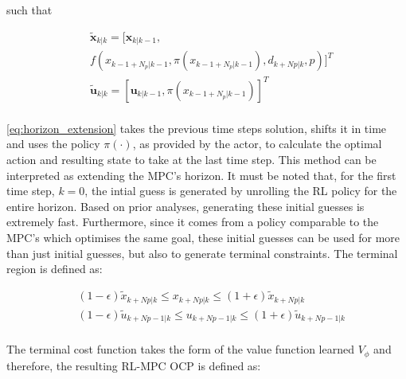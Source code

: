 such that

\begin{equation}\label{eq:horizon_extension}
	\begin{aligned}
		&\tilde{\mathbf{x}}_{k|k} = [\mathbf{x}_{k|k-1}, \\ & f(x_{k-1 + N_p|k-1}, \pi(x_{k-1 + N_p|k-1}), d_{k+Np|k},p)]^T \\ 
		&\tilde{\mathbf{u}}_{k|k} = [\mathbf{u}_{k|k-1},\pi(x_{k-1 + N_p|k-1})]^T\\
	\end{aligned}
\end{equation}

\autoref{eq:horizon_extension} takes the previous time steps solution, shifts it in time and uses the policy $\pi(\cdot)$, as provided by the actor, to calculate the optimal action and resulting state to take at the last time step. This method can be interpreted as extending the MPC's horizon. It must be noted that, for the first time step, $k=0$, the intial guess is generated by unrolling the RL policy for the entire horizon. Based on prior analyses, generating these initial guesses is extremely fast. Furthermore, since it comes from a policy comparable to the MPC’s which optimises the same goal, these initial guesses can be used for more than just initial guesses, but also to generate terminal constraints. The terminal region is defined as:

\begin{equation}\label{eq:terminal-region}
	\begin{aligned}
		& (1-\epsilon)\tilde{x}_{k+Np|k} \leq x_{k+Np|k} \leq (1+\epsilon)\tilde{x}_{k+Np|k}\\
		&(1-\epsilon)\tilde{u}_{k+Np-1|k} \leq u_{k+Np-1|k} \leq (1+\epsilon) \tilde{u}_{k+Np-1|k}\\
	\end{aligned}
\end{equation}

The terminal cost function takes the form of the value function learned $V_\phi$ and therefore, the resulting RL-MPC OCP is defined as:

